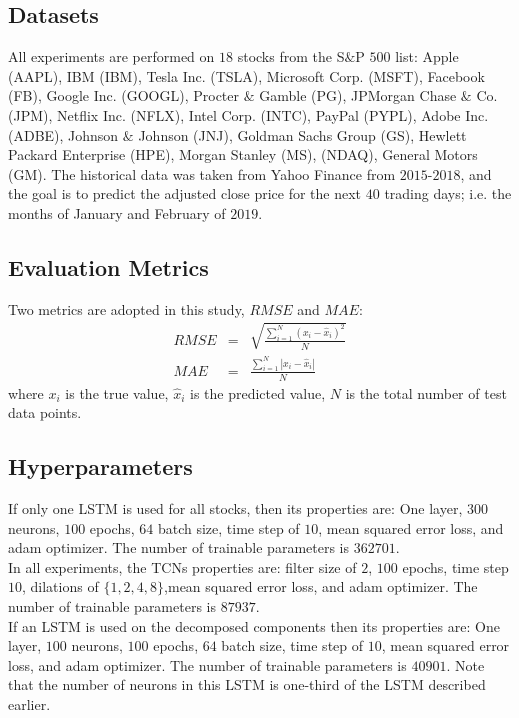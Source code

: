 \documentclass[12pt, A4]{article}
\begin{document}
\subsection{Datasets}
 All experiments are performed on $18$ stocks from the S$\&$P $500$ list: Apple (AAPL), IBM (IBM), Tesla Inc. (TSLA), Microsoft Corp. (MSFT), Facebook (FB), Google Inc. (GOOGL), Procter $\&$ Gamble (PG), JPMorgan Chase $\&$ Co. (JPM), Netflix Inc. (NFLX), Intel Corp. (INTC), PayPal (PYPL), Adobe Inc. (ADBE), Johnson $\&$ Johnson (JNJ), Goldman Sachs Group (GS), Hewlett Packard Enterprise (HPE), Morgan Stanley (MS), (NDAQ), General Motors (GM). The historical data was taken from Yahoo Finance from $2015$-$2018$, and the goal is to predict the adjusted close price for the next $40$ trading days; i.e. the months of January and February of $2019$. 

\subsection{Evaluation Metrics}
Two metrics are adopted in this study, $RMSE$ and $MAE$:
\begin{eqnarray}
	RMSE &=& \sqrt{\frac{\sum_{i=1}^{N}(x_{i} - \hat{x}_{i})^{2} }{N} } \label{RMSE} \\
	MAE &=& \frac{\sum_{i=1}^{N} |x_{i} - \hat{x}_{i}| }{N} \label{MAE}
\end{eqnarray}
where $x_{i}$ is the true value, $\hat{x}_{i}$ is the predicted value, $N$ is the total number of test data points. 

\subsection{Hyperparameters}

If only one LSTM is used for all stocks, then its properties are: One layer, $300$ neurons, $100$ epochs, $64$ batch size, time step of $10$, mean squared error loss, and adam optimizer. The number of trainable parameters is $362701$. \\

In all experiments, the TCNs properties are: filter size of $2$, $100$ epochs, time step $10$, dilations of $\{1,2,4,8\}$,mean squared error loss, and adam optimizer.  The number of trainable parameters is $87937$. \\

If an LSTM is used on the decomposed components then its properties are: One layer, $100$ neurons, $100$ epochs, $64$ batch size, time step of $10$, mean squared error loss, and adam optimizer. The number of trainable parameters is $40901$.  Note that the number of neurons in this LSTM is one-third of the LSTM described earlier. 
\end{document}
